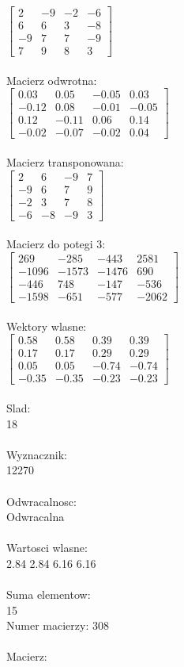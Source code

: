 \documentclass[a4paper,12pt]{article}
\begin{document}
$\begin{bmatrix} 2&-9&-2&-6\\6&6&3&-8\\-9&7&7&-9\\7&9&8&3 \end{bmatrix}$
\\
\\
Macierz odwrotna:\\

$\begin{bmatrix} 0.03&0.05&-0.05&0.03\\-0.12&0.08&-0.01&-0.05\\0.12&-0.11&0.06&0.14\\-0.02&-0.07&-0.02&0.04 \end{bmatrix}$
\\
\\
Macierz transponowana:\\

$\begin{bmatrix} 2&6&-9&7\\-9&6&7&9\\-2&3&7&8\\-6&-8&-9&3 \end{bmatrix}$
\\
\\
Macierz do potegi 3:\\

$\begin{bmatrix} 269&-285&-443&2581\\-1096&-1573&-1476&690\\-446&748&-147&-536\\-1598&-651&-577&-2062 \end{bmatrix}$
\\
\\
Wektory wlasne:\\

$\begin{bmatrix} 0.58&0.58&0.39&0.39\\0.17&0.17&0.29&0.29\\0.05&0.05&-0.74&-0.74\\-0.35&-0.35&-0.23&-0.23 \end{bmatrix}$
\\
\\
Slad:\\
18
\\
\\
Wyznacznik:\\
12270
\\
\\
Odwracalnosc:\\
Odwracalna
\\
\\
Wartosci wlasne:\\
2.84 2.84 6.16 6.16
\\
\\
Suma elementow:\\
15
\\
\newpage
Numer macierzy:
308
\\
\\
Macierz:\\
\end{document}
